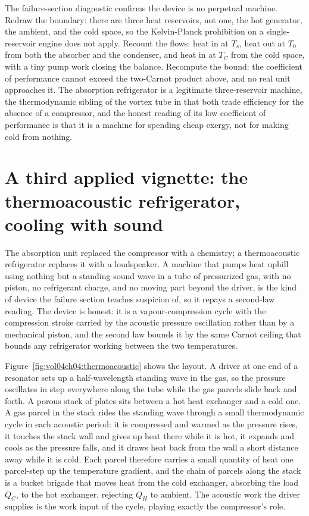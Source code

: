 The failure-section diagnostic confirms the device is no perpetual machine.
Redraw the boundary: there are three heat reservoirs, not one, the hot generator,
the ambient, and the cold space, so the Kelvin-Planck prohibition on a
single-reservoir engine does not apply. Recount the flows: heat in at $T_s$,
heat out at $T_0$ from both the absorber and the condenser, and heat in at $T_C$
from the cold space, with a tiny pump work closing the balance. Recompute the
bound: the coefficient of performance cannot exceed the two-Carnot product above,
and no real unit approaches it. The absorption refrigerator is a legitimate
three-reservoir machine, the thermodynamic sibling of the vortex tube in that
both trade efficiency for the absence of a compressor, and the honest reading of
its low coefficient of performance is that it is a machine for spending cheap
exergy, not for making cold from nothing.

\section{A third applied vignette: the thermoacoustic refrigerator, cooling with sound}

The absorption unit replaced the compressor with a chemistry; a thermoacoustic
refrigerator replaces it with a loudspeaker. A machine that pumps heat uphill using
nothing but a standing sound wave in a tube of pressurized gas, with no piston, no
refrigerant charge, and no moving part beyond the driver, is the kind of device the
failure section teaches suspicion of, so it repays a second-law reading. The device
is honest: it is a vapour-compression cycle with the compression stroke carried by
the acoustic pressure oscillation rather than by a mechanical piston, and the second
law bounds it by the same Carnot ceiling that bounds any refrigerator working
between the two temperatures.

Figure~\ref{fig:vol04ch04:thermoacoustic} shows the layout. A driver at one end of
a resonator sets up a half-wavelength standing wave in the gas, so the pressure
oscillates in step everywhere along the tube while the gas parcels slide back and
forth. A porous stack of plates sits between a hot heat exchanger and a cold one. A
gas parcel in the stack rides the standing wave through a small thermodynamic cycle
in each acoustic period: it is compressed and warmed as the pressure rises, it
touches the stack wall and gives up heat there while it is hot, it expands and cools
as the pressure falls, and it draws heat back from the wall a short distance away
while it is cold. Each parcel therefore carries a small quantity of heat one
parcel-step up the temperature gradient, and the chain of parcels along the stack is
a bucket brigade that moves heat from the cold exchanger, absorbing the load $Q_C$,
to the hot exchanger, rejecting $Q_H$ to ambient. The acoustic work the driver
supplies is the work input of the cycle, playing exactly the compressor's role.

